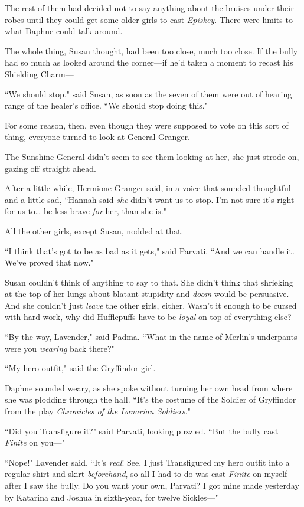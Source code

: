The rest of them had decided not to say anything about the bruises under their robes until they could get some older girls to cast \emph{Episkey}. There were limits to what Daphne could talk around.

The whole thing, Susan thought, had been too close, much too close. If the bully had so much as looked around the corner—if he'd taken a moment to recast his Shielding Charm—

``We should stop," said Susan, as soon as the seven of them were out of hearing range of the healer's office. ``We should stop doing this."

For some reason, then, even though they were supposed to vote on this sort of thing, everyone turned to look at General Granger.

The Sunshine General didn't seem to see them looking at her, she just strode on, gazing off straight ahead.

After a little while, Hermione Granger said, in a voice that sounded thoughtful and a little sad, ``Hannah said \emph{she} didn't want us to stop. I'm not sure it's right for us to{\ldots} be less brave \emph{for} her, than she is."

All the other girls, except Susan, nodded at that.

``I think that's got to be as bad as it gets," said Parvati. ``And we can handle it. We've proved that now."

Susan couldn't think of anything to say to that. She didn't think that shrieking at the top of her lungs about blatant stupidity and \emph{doom} would be persuasive. And she couldn't just \emph{leave} the other girls, either. Wasn't it enough to be cursed with hard work, why did Hufflepuffs have to be \emph{loyal} on top of everything else?

``By the way, Lavender," said Padma. ``What in the name of Merlin's underpants were you \emph{wearing} back there?"

``My hero outfit," said the Gryffindor girl.

Daphne sounded weary, as she spoke without turning her own head from where she was plodding through the hall. ``It's the costume of the Soldier of Gryffindor from the play \emph{Chronicles of the Lunarian Soldiers}."

``Did you Transfigure it?" said Parvati, looking puzzled. ``But the bully cast \emph{Finite} on you—"

``Nope!" Lavender said. ``It's \emph{real}! See, I just Transfigured my hero outfit into a regular shirt and skirt \emph{beforehand}, so all I had to do was cast \emph{Finite} on myself after I saw the bully. Do you want your own, Parvati? I got mine made yesterday by Katarina and Joshua in sixth-year, for twelve Sickles—"

